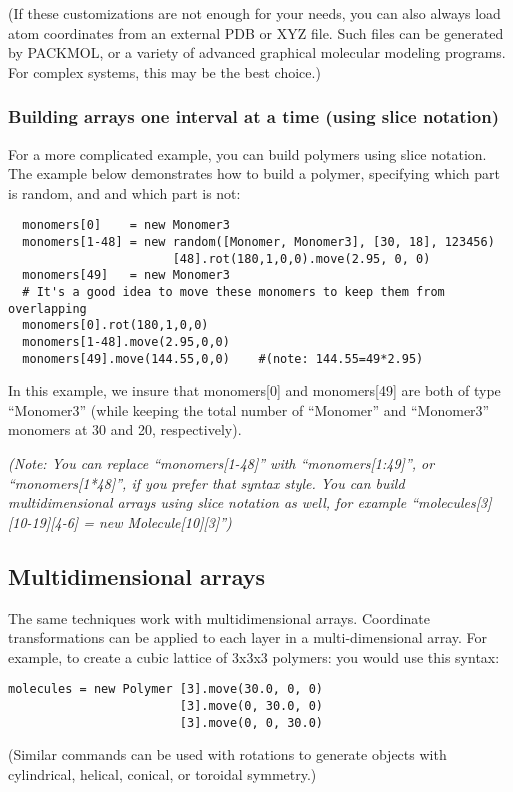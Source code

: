 \documentclass[11pt]{article}
\begin{document}
(If these customizations
 are not enough for your needs, you can also always load atom 
coordinates from an external PDB or XYZ file.
Such files can be generated by PACKMOL, 
or a variety of advanced graphical molecular modeling programs. 
For complex systems, this may be the best choice.)




\subsubsection{Building arrays one interval at a time (using slice notation)}

For a more complicated example, you can build polymers using slice notation.
The example below demonstrates how to build a polymer,
specifying which part is random, and and which part is not:

\begin{verbatim}
  monomers[0]    = new Monomer3
  monomers[1-48] = new random([Monomer, Monomer3], [30, 18], 123456)
                       [48].rot(180,1,0,0).move(2.95, 0, 0)
  monomers[49]   = new Monomer3
  # It's a good idea to move these monomers to keep them from overlapping
  monomers[0].rot(180,1,0,0)
  monomers[1-48].move(2.95,0,0)
  monomers[49].move(144.55,0,0)    #(note: 144.55=49*2.95)
\end{verbatim}
In this example, we insure that monomers[0] and monomers[49] are both
of type ``Monomer3'' 
(while keeping the total number of ``Monomer'' and ``Monomer3'' monomers at 
 30 and 20, respectively).

\textit{(Note: You can replace ``monomers[1-48]'' with
``monomers[1:49]'', or ``monomers[1*48]'', if you prefer that syntax style.
You can build multidimensional arrays using slice notation as well, for example
``molecules[3][10-19][4-6] = new Molecule[10][3]'')}



\subsection{Multidimensional arrays}
\label{sec:multidimensional_arrays}
The same techniques work with multidimensional arrays.
Coordinate transformations can be applied to each layer
in a multi-dimensional array.
For example, to create a cubic lattice of 3x3x3 polymers:
you would use this syntax:
\begin{verbatim}
molecules = new Polymer [3].move(30.0, 0, 0)
                        [3].move(0, 30.0, 0)
                        [3].move(0, 0, 30.0)
\end{verbatim}
(Similar commands can be used with rotations to generate objects
with cylindrical, helical, conical, or toroidal symmetry.)
\end{document}
